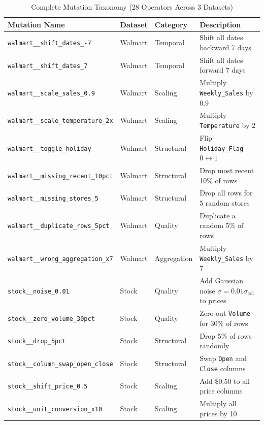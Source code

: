 \documentclass[journal]{IEEEtran}
\newcommand{\mut}[1]{\mbox{\texttt{#1}}}
\begin{document}
\begin{table}[!t]
\renewcommand{\arraystretch}{1.15}
\caption{Complete Mutation Taxonomy (28 Operators Across 3 Datasets)}
\label{tab:mutations}
\centering
\small
\begin{tabular}{llll}
\toprule
\textbf{Mutation Name} & \textbf{Dataset} & \textbf{Category} & \textbf{Description} \\
\midrule
\mut{walmart\_\_shift\_dates\_-7}        & Walmart & Temporal     & Shift all dates backward 7 days \\
\mut{walmart\_\_shift\_dates\_7}         & Walmart & Temporal     & Shift all dates forward 7 days \\
\mut{walmart\_\_scale\_sales\_0.9}       & Walmart & Scaling      & Multiply \texttt{Weekly\_Sales} by 0.9 \\
\mut{walmart\_\_scale\_temperature\_2x}  & Walmart & Scaling      & Multiply \texttt{Temperature} by 2 \\
\mut{walmart\_\_toggle\_holiday}         & Walmart & Structural   & Flip \texttt{Holiday\_Flag} $0\leftrightarrow1$ \\
\mut{walmart\_\_missing\_recent\_10pct}  & Walmart & Structural   & Drop most recent 10\% of rows \\
\mut{walmart\_\_missing\_stores\_5}      & Walmart & Structural   & Drop all rows for 5 random stores \\
\mut{walmart\_\_duplicate\_rows\_5pct}   & Walmart & Quality      & Duplicate a random 5\% of rows \\
\mut{walmart\_\_wrong\_aggregation\_x7}  & Walmart & Aggregation  & Multiply \texttt{Weekly\_Sales} by 7 \\
\midrule
\mut{stock\_\_noise\_0.01}               & Stock   & Quality      & Add Gaussian noise $\sigma=0.01\sigma_{\mathrm{col}}$ to prices \\
\mut{stock\_\_zero\_volume\_30pct}       & Stock   & Quality      & Zero out \texttt{Volume} for 30\% of rows \\
\mut{stock\_\_drop\_5pct}                & Stock   & Structural   & Drop 5\% of rows randomly \\
\mut{stock\_\_column\_swap\_open\_close} & Stock   & Structural   & Swap \texttt{Open} and \texttt{Close} columns \\
\mut{stock\_\_shift\_price\_0.5}         & Stock   & Scaling      & Add \$0.50 to all price columns \\
\mut{stock\_\_unit\_conversion\_x10}     & Stock   & Scaling      & Multiply all prices by 10 \\

\end{tabular}
\end{table}
\end{document}
